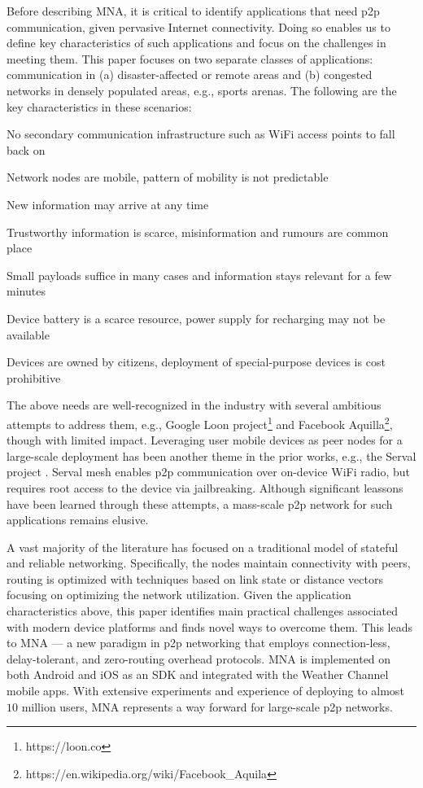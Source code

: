 \documentclass[conference]{IEEEtran}
\newcommand{\taskprefix}{CH}
\newcommand{\tasksize}{\normalsize}
\newenvironment{taskenv}[1]{\begin{list}{{\tasksize\sc \theenumi.}}{\usecounter{enumi}
      \settowidth{\labelwidth}{{\tasksize\sc \taskprefix#1-99}}
      \setlength{\leftmargin}{\labelwidth}
}}{\end{list}}
\newcounter{task}
\newcommand{\btask}{\begin{taskenv}{\taskprefix}\setcounter{enumi}{\value{task}}\renewcommand{\theenumi}{\taskprefix$_{\arabic{enumi}}$}}
\newcommand{\etask}{\setcounter{task}{\value{enumi}}\renewcommand{\theenumi}{\arabic{enumi}.}\end{taskenv}}
\begin{document}
Before describing MNA, it is critical to identify applications that
need p2p communication, given pervasive Internet connectivity. Doing
so enables us to define key characteristics of such applications and
focus on the challenges in meeting them.  This paper focuses on two
separate classes of applications: communication in
(a) disaster-affected or remote areas and (b) congested networks in
densely populated areas, e.g., sports arenas.  The following are the
key characteristics in these scenarios:

%
\btask
%
\item\label{c:0} No secondary communication infrastructure such as WiFi
  access points to fall back on
\item\label{c:1} Network nodes are mobile, pattern of mobility is not
  predictable
\item\label{c:2} New information may arrive at any time
\item\label{c:3} Trustworthy information is scarce, misinformation and
  rumours are common place
\item\label{c:4}  Small payloads suffice in many cases and information
  stays relevant for a few minutes
\item\label{c:5}  Device battery is a scarce resource, power supply
  for recharging may not be available
\item\label{c:6}  Devices are owned by citizens, deployment of
  special-purpose devices is cost prohibitive
%
\etask
%

The above needs are well-recognized in the industry with several
ambitious attempts to address them, e.g., Google Loon
project\footnote{https://loon.co} and Facebook
Aquilla\footnote{https://en.wikipedia.org/wiki/Facebook\_Aquila},
though with limited impact. Leveraging user mobile devices as peer
nodes for a large-scale deployment has been another theme in the prior
works, e.g., the Serval project
\cite{gardner-stephen-serval-2011}. Serval mesh enables p2p
communication over on-device WiFi radio, but requires root access to
the device via jailbreaking. Although significant leassons have been
learned through these attempts, a mass-scale p2p network for such
applications remains elusive.

A vast majority of the literature has focused on a traditional model
of stateful and reliable networking. Specifically, the nodes maintain
connectivity with peers, routing is optimized with techniques based on
link state or distance vectors
\cite{clausen-olsr-2003,perkins-aodv-2003} focusing on optimizing the
network utilization. Given the application characteristics above, this
paper identifies main practical challenges associated with modern
device platforms and finds novel ways to overcome them.  This leads to
MNA --- a new paradigm in p2p networking that employs connection-less,
delay-tolerant, and zero-routing overhead protocols.  MNA is
implemented on both Android and iOS as an SDK and integrated with the
Weather Channel mobile apps. With extensive experiments and experience
of deploying to almost $10$ million users, MNA represents a way
forward for large-scale p2p networks.
\end{document}
